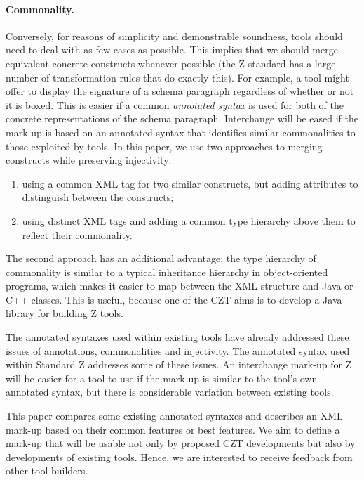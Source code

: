 \documentclass{llncs}  %
\begin{document}
\paragraph{Commonality.}
Conversely, for reasons of simplicity and demonstrable soundness, 
tools should need to deal with as few cases as possible.  This implies
that we should merge equivalent concrete constructs whenever possible
(the Z standard has a large number of transformation rules that do
exactly this).
For example, a tool might offer to display the signature 
of a schema paragraph regardless of whether or not it is boxed.
This is easier if a common \textit{annotated syntax} is used
for both of the concrete representations of the schema paragraph.
Interchange will be eased if the mark-up is based on an annotated syntax
that identifies similar commonalities to those exploited by tools.
In this paper, we use two approaches to merging constructs while preserving
injectivity:
\begin{enumerate}
\item using a common XML tag for two similar constructs, but adding
  attributes to distinguish between the constructs; 
\item using distinct XML tags and adding a common type hierarchy above
them to reflect their commonality.
\end{enumerate}
The second approach has an additional advantage: the type hierarchy of
commonality is similar to a typical inheritance hierarchy in
object-oriented programs, which makes it easier to map between the XML
structure and Java or C++ classes.  This is useful, because one of the
CZT aims is to develop a Java library for building Z tools.

\vspace{1.5ex}

The annotated syntaxes used within existing tools have already
addressed these issues of annotations, commonalities and injectivity.
The annotated syntax used within Standard Z addresses some of these issues.
An interchange mark-up for Z will be easier for a tool to use
if the mark-up is similar to the tool's own annotated syntax,
but there is considerable variation between existing tools. 

This paper compares some existing annotated syntaxes and describes an
XML mark-up based on their common features or best features. 
We aim to define a mark-up that will be usable not only by proposed CZT
developments but also by developments of existing tools.  Hence,
we are interested to receive feedback from other tool builders.
\end{document}
